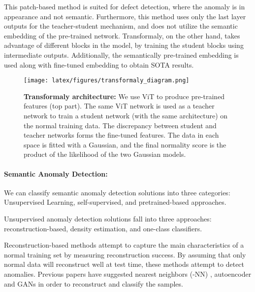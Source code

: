 \documentclass[10pt,twocolumn,letterpaper]{article}
\begin{document}
This patch-based method is suited for defect detection, where the anomaly is in appearance and not semantic. Furthermore, this method uses only the last layer outputs for the teacher-student mechanism, and does not utilize the semantic embedding of the pre-trained network. Transformaly, on the other hand, takes advantage of different blocks in the model, by training the student blocks using intermediate outputs. Additionally, the semantically pre-trained embedding is used along with fine-tuned embedding to obtain SOTA results. 



\begin{figure*}
\begin{center}
\texttt{[image: latex/figures/transformaly\_diagram.png]}

\end{center}
  \caption{{\bf Transformaly architecture:} We use ViT to produce pre-trained features (top part). The same ViT network is used as a teacher network to train a student network (with the same architecture) on the normal training data. The discrepancy between student and teacher networks forms the fine-tuned features. The data in each space is fitted with a Gaussian, and the final normality score is the product of the likelihood of the two Gaussian models.}
\label{fig:ModelArchitecture}
\end{figure*}




\paragraph{\bf Semantic Anomaly Detection:}
We can classify semantic anomaly detection solutions into three categories:  Unsupervised Learning, self-supervised, and pretrained-based approaches.

Unsupervised anomaly detection solutions fall into three approaches:  reconstruction-based, density estimation, and one-class classifiers. 

Reconstruction-based methods attempt to capture the main characteristics of a normal training set by measuring reconstruction success. By assuming that only normal data will reconstruct well at test time, these methods attempt to detect anomalies.  Previous papers have suggested  nearest neighbors (-NN) \cite{eskin2002geometric}, autoencoder \cite{xia2015learning} and GANs \cite{zenati2018efficient, li2018anomaly, deecke2018image} in order to reconstruct and classify the samples. 
\end{document}

